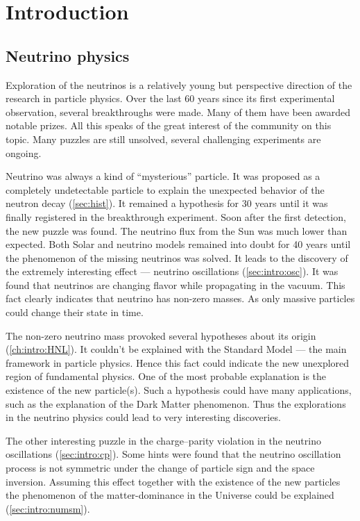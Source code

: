 \documentclass[../main.tex]{subfiles}
\begin{document}
\renewcommand{\labelitemi}{\ding{226}}
\renewcommand{\labelitemii}{\ding{227}}


\part{Introduction}
\label{part:intro:general}

\chapter{Neutrino physics}
\label{ch:nu_phys}
Exploration of the neutrinos is a relatively young but perspective direction of the research in particle physics. Over the last 60 years since its first experimental observation, several breakthroughs were made. Many of them have been awarded notable prizes. All this speaks of the great interest of the community on this topic. Many puzzles are still unsolved, several challenging experiments are ongoing.

Neutrino was always a kind of ``mysterious'' particle. It was proposed as a completely undetectable particle to explain the unexpected behavior of the neutron decay (\autoref{sec:hist}). It remained a hypothesis for 30 years until it was finally registered in the breakthrough experiment. Soon after the first detection, the new puzzle was found. The neutrino flux from the Sun was much lower than expected. Both Solar and neutrino models remained into doubt for 40 years until the phenomenon of the missing neutrinos was solved. It leads to the discovery of the extremely interesting effect --- neutrino oscillations (\autoref{sec:intro:osc}). It was found that neutrinos are changing flavor while propagating in the vacuum. This fact clearly indicates that neutrino has non-zero masses. As only massive particles could change their state in time.

The non-zero neutrino mass provoked several hypotheses about its origin (\autoref{ch:intro:HNL}). It couldn't be explained with the Standard Model --- the main framework in particle physics. Hence this fact could indicate the new unexplored region of fundamental physics. One of the most probable explanation is the existence of the new particle(s). Such a hypothesis could have many applications, such as the explanation of the Dark Matter phenomenon. Thus the explorations in the neutrino physics could lead to very interesting discoveries.

The other interesting puzzle in the charge--parity violation in the neutrino oscillations (\autoref{sec:intro:cp}). Some hints were found that the neutrino oscillation process is not symmetric under the change of particle sign and the space inversion. Assuming this effect together with the existence of the new particles the phenomenon of the matter-dominance in the Universe could be explained (\autoref{sec:intro:numsm}).
\end{document}
